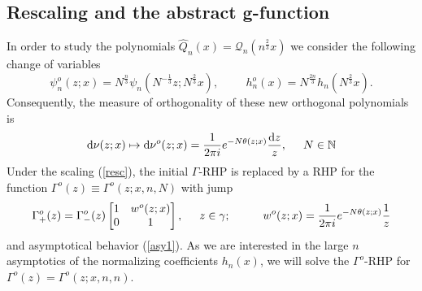 \documentclass[10pt,oneside,reqno]{amsart}
\numberwithin{equation}{section}
\renewcommand{\d}{{\mathrm d}}
\def\wh{\widehat}
\def\eqref#1{(\ref{#1})}
\begin{document}
\subsection{Rescaling and the abstract g-function} 
%
In order to study the polynomials $\wh Q_n(x) = \mathcal Q_n(n^\frac 23 x)$ we consider the following change of variables 
\begin{equation}\label{orel}
 \psi_n^o(z;x) = N^{\frac{n}{3}}\psi_n\left(N^{-\frac{1}{3}}z;N^{\frac{2}{3}}x\right),\hspace{1cm} h_n^o(x) = N^{\frac{2n}{3}}h_n\left(N^{\frac{2}{3}}x\right).
\end{equation}
Consequently, the measure of orthogonality of these new orthogonal polynomials is 
\begin{equation}\label{resc}
  \d\nu(z;x)\mapsto \d\nu^o(z;x) = \frac{1}{2\pi i} e^{-N\theta(z;x)}\frac{\d z}{z},\hspace{0.5cm}N\in\mathbb{N}
\end{equation}
Under the scaling \eqref{resc}, the initial $\Gamma$-RHP is replaced by a RHP for the function $\Gamma^o(z)\equiv\Gamma^o(z;x,n,N)$ with jump
\begin{equation*}
    \Gamma^o_+(z)=\Gamma^o_-(z)\begin{bmatrix}
					     1 & w^o(z;x)\\
					    0 & 1\\
                                           \end{bmatrix},\hspace{0.5cm}z\in \gamma;\hspace{1cm}w^o(z;x) = \frac{1}{2\pi i}e^{-N\theta(z;x)}\frac{1}{z}
\end{equation*}
and asymptotical behavior \eqref{asy1}. As we are interested in the large $n$ asymptotics of the normalizing coefficients $h_n(x)$, we will solve the $\Gamma^o$-RHP for 
$\Gamma^o(z)=\Gamma^o(z;x,n,n)$.\smallskip
\end{document}
